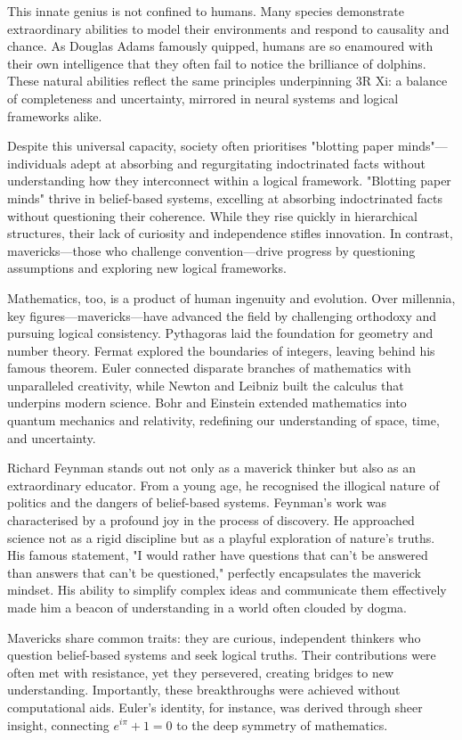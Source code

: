 \documentclass[12pt]{article}
\begin{document}
This innate genius is not confined to humans. Many species demonstrate extraordinary abilities to model their environments and respond to causality and chance. As Douglas Adams famously quipped, humans are so enamoured with their own intelligence that they often fail to notice the brilliance of dolphins. These natural abilities reflect the same principles underpinning 3R Xi: a balance of completeness and uncertainty, mirrored in neural systems and logical frameworks alike.

Despite this universal capacity, society often prioritises "blotting paper minds"—individuals adept at absorbing and regurgitating indoctrinated facts without understanding how they interconnect within a logical framework. "Blotting paper minds" thrive in belief-based systems, excelling at absorbing indoctrinated facts without questioning their coherence. While they rise quickly in hierarchical structures, their lack of curiosity and independence stifles innovation. In contrast, mavericks—those who challenge convention—drive progress by questioning assumptions and exploring new logical frameworks.

Mathematics, too, is a product of human ingenuity and evolution. Over millennia, key figures—mavericks—have advanced the field by challenging orthodoxy and pursuing logical consistency. Pythagoras laid the foundation for geometry and number theory. Fermat explored the boundaries of integers, leaving behind his famous theorem. Euler connected disparate branches of mathematics with unparalleled creativity, while Newton and Leibniz built the calculus that underpins modern science. Bohr and Einstein extended mathematics into quantum mechanics and relativity, redefining our understanding of space, time, and uncertainty.

Richard Feynman stands out not only as a maverick thinker but also as an extraordinary educator. From a young age, he recognised the illogical nature of politics and the dangers of belief-based systems. Feynman’s work was characterised by a profound joy in the process of discovery. He approached science not as a rigid discipline but as a playful exploration of nature’s truths. His famous statement, "I would rather have questions that can’t be answered than answers that can’t be questioned," perfectly encapsulates the maverick mindset. His ability to simplify complex ideas and communicate them effectively made him a beacon of understanding in a world often clouded by dogma.

Mavericks share common traits: they are curious, independent thinkers who question belief-based systems and seek logical truths. Their contributions were often met with resistance, yet they persevered, creating bridges to new understanding. Importantly, these breakthroughs were achieved without computational aids. Euler’s identity, for instance, was derived through sheer insight, connecting \(e^{i\pi} + 1 = 0\) to the deep symmetry of mathematics.
\end{document}
